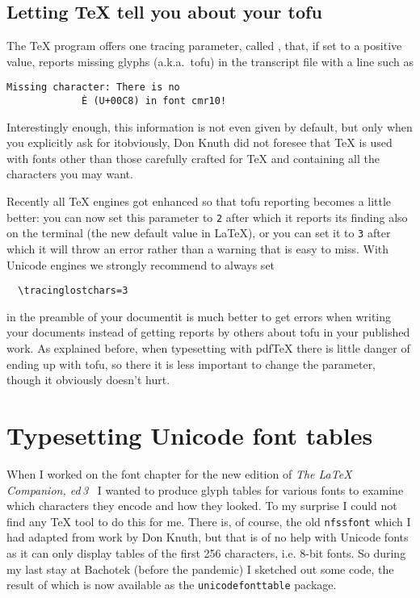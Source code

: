 \documentclass{ltugboat}
\newcommand\pdfTeX{pdf\TeX}
\providecommand\pkg[1]{\texttt{#1}}
\begin{document}
\subsection{Letting \TeX{} tell you about your tofu}

The \TeX{} program offers one tracing parameter, called
, that, if set to a positive value, reports missing
glyphs (a.k.a.\ tofu) in the transcript file with a line such as
\begin{verbatim}
Missing character: There is no
             È (U+00C8) in font cmr10!
\end{verbatim}
Interestingly enough, this information is not even given by default, but
only when you explicitly ask for it\Dash obviously, Don Knuth did not
foresee that \TeX{} is used with fonts other than those carefully
crafted for \TeX{} and containing all the characters you may want.

Recently all \TeX{} engines got enhanced so that tofu reporting
becomes a little better: you can now set this parameter to \texttt{2}
after which it reports its finding also on the terminal (the new
default value in \LaTeX{}), or you can set it to \texttt{3} after
which it will throw an error rather than a warning that is easy to
miss.
%
With Unicode engines we strongly recommend to always set
\begin{verbatim}
  \tracinglostchars=3
\end{verbatim}
in the preamble of your document\Dash it is much better to get errors
when writing your documents instead of getting reports by others about
tofu in your published work.  As explained before, when typesetting with
\pdfTeX{} there is little danger of ending up with tofu, so there it is
less important to change the parameter, though it obviously doesn't
hurt.


\section{Typesetting Unicode font tables}

When I worked on the font chapter for the new edition of \emph{The
  \LaTeX{} Companion, ed\,3}~\cite{TLC3} I wanted to produce glyph
tables for various fonts to examine which characters they encode and
how they looked. To my surprise I could not find any \TeX{} tool to do
this for me. There is, of course, the old \texttt{nfssfont} which I
had adapted from work by Don Knuth, but that is of no help with
Unicode fonts as it can only display tables of the first 256
characters, i.e. 8-bit fonts. So during my last stay at Bachotek
(before the pandemic) I sketched out some code, the result of which is
now available as the \pkg{unicodefonttable} package.


\fontsize{9.5}{11}\selectfont
\SetBibJustification{\raggedright}






\makesignature
\end{document}
